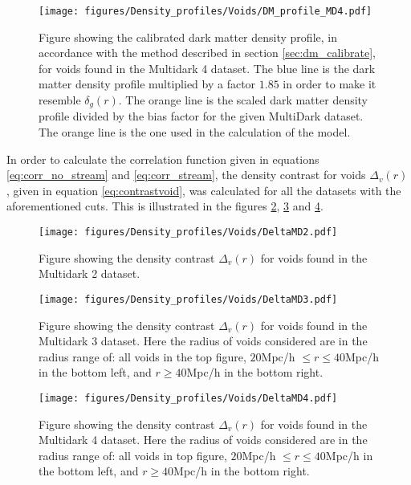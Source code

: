 \begin{figure}[H]
    \texttt{[image: figures/Density\_profiles/Voids/DM\_profile\_MD4.pdf]}
    \caption{Figure showing the calibrated dark matter density profile, in accordance with the method described in section \ref{sec:dm_calibrate}, for voids found in the Multidark 4 dataset. The blue line is the dark matter density profile multiplied by a factor $1.85$ in order to make it resemble $\delta_g(r)$. The orange line is the scaled dark matter density profile divided by the bias factor for the given MultiDark dataset. The orange line is the one used in the calculation of the model.}
    \label{fig:deltadmMD4}
\end{figure}
In order to calculate the correlation function given in equations \ref{eq:corr_no_stream} and \ref{eq:corr_stream}, the density contrast for voids $\Delta_v(r)$, given in equation \ref{eq:contrastvoid}, was calculated for all the datasets with the aforementioned cuts. This is illustrated in the figures \ref{fig:DeltaMD2}, \ref{fig:DeltaMD3} and \ref{fig:DeltaMD4}. 
\begin{figure}[H]
    \texttt{[image: figures/Density\_profiles/Voids/DeltaMD2.pdf]}
    \caption{Figure showing the density contrast $\Delta_v(r)$ for voids found in the Multidark 2 dataset.}
    \label{fig:DeltaMD2}
\end{figure}
\begin{figure}[H]
    \texttt{[image: figures/Density\_profiles/Voids/DeltaMD3.pdf]}
    \caption{Figure showing the density contrast $\Delta_v(r)$ for voids found in the Multidark 3 dataset. Here the radius of voids considered are in the radius range of: all voids in the top figure, $20$Mpc/h $\leq r\leq 40$Mpc/h in the bottom left, and $r\geq 40$Mpc/h in the bottom right.}
    \label{fig:DeltaMD3}
\end{figure}
\begin{figure}[H]
    \texttt{[image: figures/Density\_profiles/Voids/DeltaMD4.pdf]}
    \caption{Figure showing the density contrast $\Delta_v(r)$ for voids found in the Multidark 4 dataset. Here the radius of voids considered are in the radius range of: all voids in top figure, $20$Mpc/h $\leq r\leq 40$Mpc/h in the bottom left, and $r\geq 40$Mpc/h in the bottom right.}
    \label{fig:DeltaMD4}
\end{figure}

